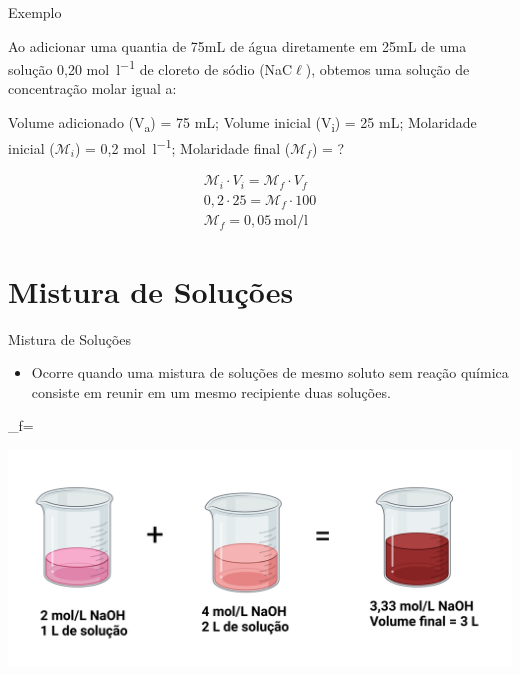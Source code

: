 \documentclass[presentation,professionalfonts,aspectratio=169]{beamer}
\begin{document}
\begin{frame}[label={sec:orgbcc6802}]{Exemplo}
\begin{question}
Ao adicionar uma quantia de 75mL de água diretamente em 25mL de uma solução 0,20 \unit{\mol\per\litre} de cloreto de sódio (NaC\(\ell\)), obtemos uma solução de concentração molar igual a:
\end{question}

\begin{answer}[print=true]
Volume adicionado (V\textsubscript{a}) = 75 mL;  Volume inicial (V\textsubscript{i}) = 25 mL; Molaridade inicial (\(\mathcal{M}_i\)) = 0,2 \unit{\mol\per\litre}; Molaridade final (\(\mathcal{M}_f\)) = ?

\begin{align*}
\mathcal{M}_i \cdot V_i = \mathcal{M}_f \cdot V_f \\
0,2 \cdot 25 = \mathcal{M}_f \cdot 100\\
\mathcal{M}_f= 0,05~\unit{\mol\per\litre}
\end{align*}
\end{answer}
\end{frame}

\section{Mistura de Soluções}
\label{sec:orgf581666}


\begin{frame}[label={sec:orga631b3f}]{Mistura de Soluções}
\begin{itemize}
\item Ocorre quando uma mistura de soluções de mesmo soluto sem reação química consiste em reunir em um mesmo recipiente duas soluções.
\end{itemize}

\begin{tcolorbox}
_f= 
\end{tcolorbox}


\begin{center}
\includegraphics[scale=.3]{FQ/Solucoes/Mistura_Solucao.png}
\end{center}
\end{frame}
\end{document}
